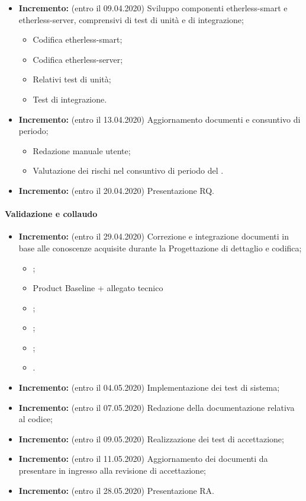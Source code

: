 \begin{itemize}
	\item \textbf{ Incremento:} (entro il 09.04.2020) Sviluppo componenti etherless-smart e etherless-server, comprensivi di test di unità e di integrazione;
  \begin{itemize}
    \item Codifica etherless-smart;
    \item Codifica etherless-server;
    \item Relativi test di unità;
    \item Test di integrazione.
  \end{itemize}
	\item \textbf{ Incremento:} (entro il 13.04.2020) Aggiornamento documenti e consuntivo di periodo;
  \begin{itemize}
    \item Redazione manuale utente;
    \item Valutazione dei rischi nel consuntivo di periodo del \docs.
  \end{itemize}
	\item \textbf{ Incremento:} (entro il 20.04.2020) Presentazione RQ.
\end{itemize}
\paragraph{Validazione e collaudo }
\begin{itemize}
  \item \textbf{ Incremento:} (entro il 29.04.2020) Correzione e integrazione documenti in base alle conoscenze acquisite durante la Progettazione di dettaglio e codifica;
  \begin{itemize}
    \item {}\docs;
    \item Product Baseline + allegato tecnico
    \item {}\docs;
    \item {}\docs;
    \item {}\docs;
    \item {}\docs.
  \end{itemize}
	\item \textbf{ Incremento:} (entro il 04.05.2020) Implementazione dei test di sistema;
	\item \textbf{ Incremento:} (entro il 07.05.2020) Redazione della documentazione relativa al codice;
	\item \textbf{ Incremento:} (entro il 09.05.2020) Realizzazione dei test di accettazione;
	\item \textbf{ Incremento:} (entro il 11.05.2020) Aggiornamento dei documenti da presentare in ingresso alla revisione di accettazione;
	\item \textbf{ Incremento:} (entro il 28.05.2020) Presentazione RA.
\end{itemize}

